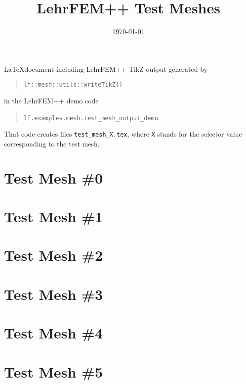 \documentclass[a4wide]{article}
\title{LehrFEM++ Test Meshes}
\date{\today}
\begin{document}
\maketitle

\noindent
\LaTeX document including LehrFEM++ TikZ output generated by
\begin{quote}
  \texttt{lf::mesh::utils::writeTikZ()}
\end{quote}
in the LehrFEM++ demo code
\begin{quote}
  \texttt{lf.examples.mesh.test\_mesh\_output\_demo}.
\end{quote}
That code creates
files \texttt{test\_mesh\_X.tex}, where \texttt{X} stands for the
selector value corresponding to the test mesh.

\section{Test Mesh \#0}

 

\section{Test Mesh \#1}

 

\section{Test Mesh \#2}

 

\section{Test Mesh \#3}

 

\section{Test Mesh \#4}

 

\section{Test Mesh \#5}

 
\end{document}
